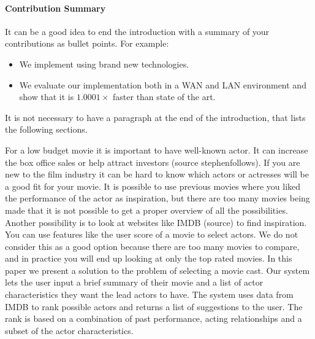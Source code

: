 \paragraph{Contribution Summary} 
It can be a good idea to end the introduction with a summary of your contributions as bullet points.
For example:
\begin{itemize}
\item We implement \paxos using brand new technologies.
\item We evaluate our implementation both in a WAN and LAN environment and show that it is $1.0001\times$ faster than state of the art.
\end{itemize}
It is not necessary to have a paragraph at the end of the introduction, that lists the following sections. 


For a low budget movie it is important to have well-known actor. It can increase the box office sales or help attract investors (source stephenfollows).
If you are new to the film industry it can be hard to know which actors or actresses will be a good fit for your movie.
It is possible to use previous movies where you liked the performance of the actor as inspiration, but there are too many movies
being made that it is not possible to get a proper overview of all the possibilities. Another possibility is to look at websites like
IMDB (source) to find inspiration. You can use features like the user score of a movie to select actors. We do not consider this
as a good option because there are too many movies to compare, and in practice you will end up looking at only the top rated movies.
In this paper we present a solution to the problem of selecting a movie cast. Our system lets the user input a brief summary of their
movie and a list of actor characteristics they want the lead actors to have. The system uses data from IMDB to rank possible actors
and returns a list of suggestions to the user. The rank is based on a combination of past performance, acting relationships and
a subset of the actor characteristics. 

